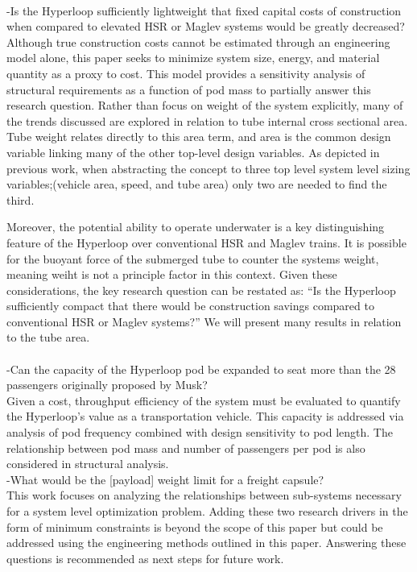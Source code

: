 	\\
	-Is the Hyperloop sufficiently lightweight that fixed capital costs of construction
	when compared to elevated HSR or Maglev systems would be greatly decreased?\\

	Although true construction costs cannot be estimated through an engineering
	model alone, this paper seeks to minimize system size, energy, and material
	quantity as a proxy to cost. This model provides a sensitivity
	analysis of structural requirements as a function of pod mass to partially
	answer this research question. Rather than focus on weight of the system explicitly,
	many of the trends discussed are explored in relation to tube internal
	cross sectional area. Tube weight relates directly to this area term, and
	area is the common design variable linking many of the other top-level
	design variables. As depicted in previous work,
	\cite{Chin} when abstracting the concept to three top level system level
	sizing variables;(vehicle area, speed, and tube area) only two are needed
	to find the third.

	Moreover, the potential ability to operate underwater is a key distinguishing feature
	of the Hyperloop over conventional HSR and Maglev trains. It is possible for the buoyant force 
	of the submerged tube to counter the systems weight, meaning weiht is not a principle factor in this context. 
	Given these considerations, the key research
	question can be restated as: ``Is the Hyperloop sufficiently compact that
	there would be construction savings compared to conventional
	HSR or Maglev systems?'' We will present many results in relation to the tube area.\\
	\\
	-Can the capacity of the Hyperloop pod be expanded to seat more than the 28
	passengers originally proposed by Musk?\\

	Given a cost, throughput efficiency of the system must be evaluated to quantify the
	Hyperloop's value as a transportation vehicle. This capacity is addressed
	via analysis of pod frequency combined with design sensitivity to pod length. 
	The relationship between pod mass and number of passengers per pod is also considered 
	in structural analysis.\\

	-What would be the [payload] weight limit for a freight capsule?\\

	This work focuses on analyzing the relationships between sub-systems
	necessary for a system level optimization problem. Adding these two research
	drivers in the form of minimum constraints is beyond the scope of this paper
	but could be addressed using the engineering methods outlined in this paper.
	Answering these questions is recommended as next steps for future work.\\

